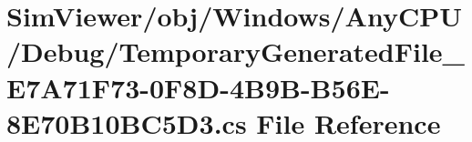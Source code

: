 \hypertarget{_sim_viewer_2obj_2_windows_2_any_c_p_u_2_debug_2_temporary_generated_file___e7_a71_f73-0_f8_d-4_c8f90cd939da8ba6a636648920bf888a}{}\section{Sim\+Viewer/obj/\+Windows/\+Any\+C\+P\+U/\+Debug/\+Temporary\+Generated\+File\+\_\+\+E7\+A71\+F73-\/0\+F8\+D-\/4\+B9\+B-\/\+B56\+E-\/8\+E70\+B10\+B\+C5\+D3.cs File Reference}
\label{_sim_viewer_2obj_2_windows_2_any_c_p_u_2_debug_2_temporary_generated_file___e7_a71_f73-0_f8_d-4_c8f90cd939da8ba6a636648920bf888a}
